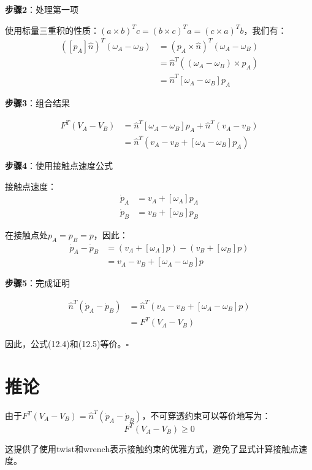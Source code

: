 \documentclass[12pt,a4paper]{article}
\begin{document}
\textbf{步骤2}：处理第一项

使用标量三重积的性质：$(a \times b)^T c = (b \times c)^T a = (c \times a)^T b$，我们有：
\begin{align}
([p_A]\hat{n})^T (\omega_A - \omega_B) &= (p_A \times \hat{n})^T (\omega_A - \omega_B) \\
&= \hat{n}^T ((\omega_A - \omega_B) \times p_A) \\
&= \hat{n}^T [\omega_A - \omega_B] p_A
\end{align}

\textbf{步骤3}：组合结果

\begin{align}
F^T (V_A - V_B) &= \hat{n}^T [\omega_A - \omega_B] p_A + \hat{n}^T (v_A - v_B) \\
&= \hat{n}^T (v_A - v_B + [\omega_A - \omega_B] p_A)
\end{align}

\textbf{步骤4}：使用接触点速度公式

接触点速度：
\begin{align}
\dot{p}_A &= v_A + [\omega_A] p_A \\
\dot{p}_B &= v_B + [\omega_B] p_B
\end{align}

在接触点处$p_A = p_B = p$，因此：
\begin{align}
\dot{p}_A - \dot{p}_B &= (v_A + [\omega_A] p) - (v_B + [\omega_B] p) \\
&= v_A - v_B + [\omega_A - \omega_B] p
\end{align}

\textbf{步骤5}：完成证明

\begin{align}
\hat{n}^T (\dot{p}_A - \dot{p}_B) &= \hat{n}^T (v_A - v_B + [\omega_A - \omega_B] p) \\
&= F^T (V_A - V_B)
\end{align}

因此，公式(12.4)和(12.5)等价。$\square$

\section{推论}

由于$F^T (V_A - V_B) = \hat{n}^T (\dot{p}_A - \dot{p}_B)$，不可穿透约束可以等价地写为：
\begin{equation}
F^T (V_A - V_B) \geq 0
\end{equation}

这提供了使用twist和wrench表示接触约束的优雅方式，避免了显式计算接触点速度。
\end{document}
